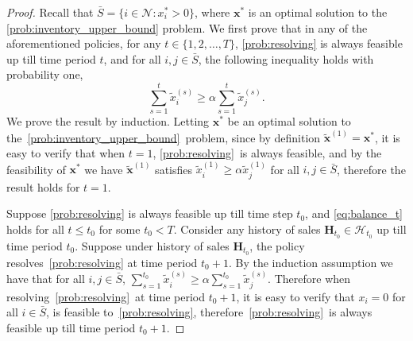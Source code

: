 \documentclass[mnsc,non-blindrev]{informs3}
\theoremstyle{definition}
\begin{document}
\begin{appendices}{\Large{}}
\begin{proof}
Recall that $\bar{S}=\{i\in\mathcal{N}:x_i^*>0\}$, where $\bm{x}^*$ is an optimal solution to the \ref{prob:inventory_upper_bound} problem. We first prove that in any of the aforementioned policies, for any $t\in\{1,2,\dots,T\}$, \ref{prob:resolving} is always feasible up till time period $t$, and for all $i,j\in\bar{S}$, the following inequality holds with probability one,
\begin{equation}\label{eq:balance_t}
\sum_{s=1}^t \tilde{x}_i^{(s)}\geq \alpha\sum_{s=1}^t\tilde{x}_j^{(s)}.
\end{equation}
We prove the result by induction. Letting $\bm{x}^*$ be an optimal solution to the~\ref{prob:inventory_upper_bound}~problem, since by definition $\tilde{\bm{x}}^{(1)}=\bm{x}^*$, it is easy to verify that when $t=1$, \ref{prob:resolving}~is always feasible, and by the feasibility of $\bm{x}^*$ we have $\tilde{\bm{x}}^{(1)}$ satisfies $\tilde{x}_i^{(1)}\geq \alpha\tilde{x}_j^{(1)}$ for all $i,j\in\bar{S}$, therefore the result holds for $t=1$. 

Suppose \ref{prob:resolving} is always feasible up till time step $t_0$, and \eqref{eq:balance_t} holds for all $t\leq t_0$ for some $t_0<T$. Consider any history of sales $\bm{H}_{t_0}\in\mathcal{H}_{t_0}$ up till time period $t_0$. Suppose under history of sales $\bm{H}_{t_0}$, the policy resolves~\ref{prob:resolving} at time period $t_0+1$. By the induction assumption we have that for all $i,j\in\bar{S}$, $\sum_{s=1}^{t_0}\tilde{x}_i^{(s)}\geq \alpha\sum_{s=1}^{t_0}\tilde{x}_j^{(s)}$. Therefore when resolving~\ref{prob:resolving}~at time period $t_0+1$, it is easy to verify that $x_i=0$ for all $i\in\bar{S}$, is feasible to~\ref{prob:resolving}, therefore~\ref{prob:resolving}~is always feasible up till time period $t_0+1$.


\end{proof}
\end{appendices}
\end{document}
